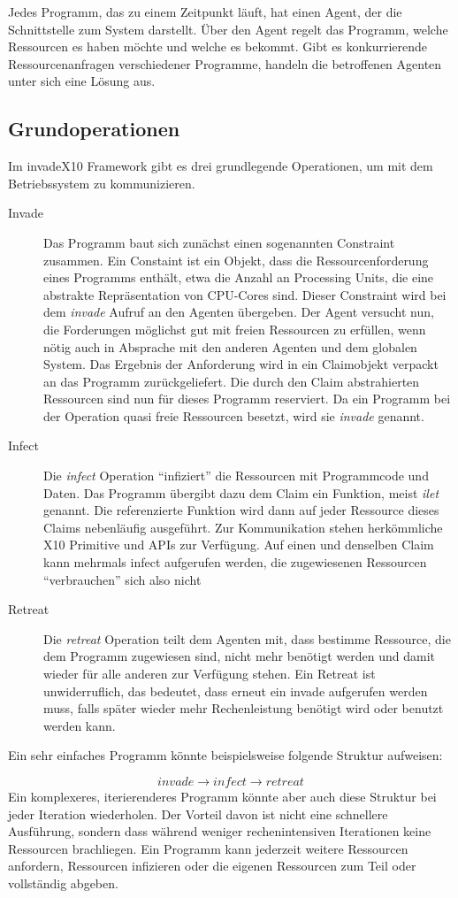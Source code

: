 Jedes Programm, das zu einem Zeitpunkt läuft, hat einen Agent, der die Schnittstelle zum System darstellt. Über den Agent regelt das Programm, welche Ressourcen es haben möchte und welche es bekommt. Gibt es konkurrierende Ressourcenanfragen verschiedener Programme, handeln die betroffenen Agenten unter sich eine Lösung aus.
\subsection{Grundoperationen} %
\label{sub:grundoperationen}

Im invadeX10 Framework gibt es drei grundlegende Operationen, um mit dem Betriebssystem zu kommunizieren.
\begin{description}
	\item[Invade] Das Programm baut sich zunächst einen sogenannten Constraint zusammen. Ein Constaint ist ein Objekt, dass die Ressourcenforderung eines Programms enthält, etwa die Anzahl an Processing Units, die eine abstrakte Repräsentation von CPU-Cores sind. Dieser Constraint wird bei dem \textit{invade} Aufruf an den Agenten übergeben. Der Agent versucht nun, die Forderungen möglichst gut mit freien Ressourcen zu erfüllen, wenn nötig auch in Absprache mit den anderen Agenten und dem globalen System. Das Ergebnis der Anforderung wird in ein Claimobjekt verpackt an das Programm zurückgeliefert. Die durch den Claim abstrahierten Ressourcen sind nun für dieses Programm reserviert. Da ein Programm bei der Operation quasi freie Ressourcen besetzt, wird sie \textit{invade} genannt.
	\item[Infect] Die \textit{infect} Operation \enquote{infiziert} die Ressourcen mit Programmcode und Daten. Das Programm übergibt dazu dem Claim ein Funktion, meist \textit{ilet} genannt. Die referenzierte Funktion wird dann auf jeder Ressource dieses Claims nebenläufig ausgeführt. Zur Kommunikation stehen herkömmliche X10 Primitive und APIs zur Verfügung. Auf einen und denselben Claim kann mehrmals infect aufgerufen werden, die zugewiesenen Ressourcen \enquote{verbrauchen} sich also nicht
	\item[Retreat] Die \textit{retreat} Operation teilt dem Agenten mit, dass bestimme Ressource, die dem Programm zugewiesen sind, nicht mehr benötigt werden und damit wieder für alle anderen zur Verfügung stehen. Ein Retreat ist unwiderruflich, das bedeutet, dass erneut ein invade aufgerufen werden muss, falls später wieder mehr Rechenleistung benötigt wird oder benutzt werden kann.
\end{description}

Ein sehr einfaches Programm könnte beispielsweise folgende Struktur aufweisen:

$$\mathit{invade}\rightarrow\mathit{infect}\rightarrow\mathit{retreat}$$
Ein komplexeres, iterierenderes Programm könnte aber auch diese Struktur bei jeder Iteration wiederholen. Der Vorteil davon ist nicht eine schnellere Ausführung, sondern dass während weniger rechenintensiven Iterationen keine Ressourcen brachliegen. Ein Programm kann jederzeit weitere Ressourcen anfordern, Ressourcen infizieren oder die eigenen Ressourcen zum Teil oder vollständig abgeben. 

